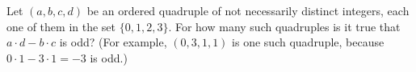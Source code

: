 Let $(a,b,c,d)$ be an ordered quadruple of not necessarily distinct integers, each one of them in the set $\{0,1,2,3\}$. For how many such quadruples is it true that $a\cdot d-b\cdot c$ is odd? (For example, $(0,3,1,1)$ is one such quadruple, because $0\cdot1-3\cdot1=-3$ is odd.)
